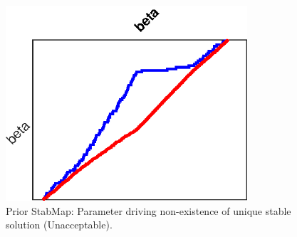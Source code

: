 
\begin{figure}[H]
\centering 
\includegraphics[width=0.8\textwidth]{RBC_kz/gsa/RBC_kz_prior_stable}
\caption{Prior StabMap: Parameter driving non-existence of unique stable solution (Unacceptable).}\label{Fig:RBC_kz_prior_stable}
\end{figure}

